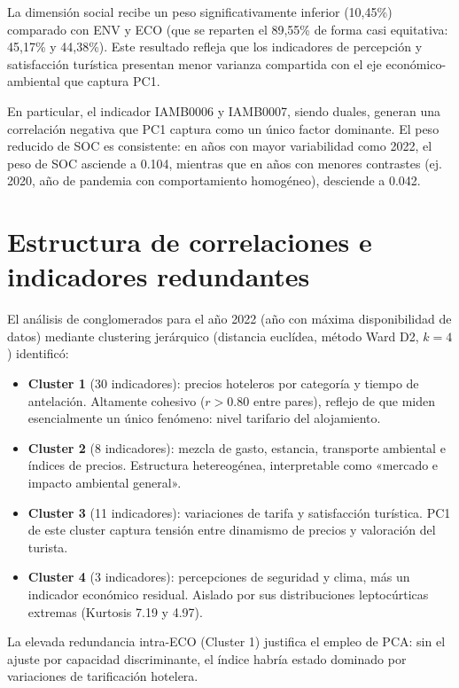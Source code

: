 La dimensión social recibe un peso significativamente inferior (10,45\%) comparado con ENV y ECO (que se reparten el 89,55\% de forma casi equitativa: 45,17\% y 44,38\%). Este resultado refleja que los indicadores de percepción y satisfacción turística presentan menor varianza compartida con el eje económico-ambiental que captura PC1. 

En particular, el indicador IAMB0006 y IAMB0007, siendo duales, generan una correlación negativa que PC1 captura como un único factor dominante. El peso reducido de SOC es consistente: en años con mayor variabilidad como 2022, el peso de SOC asciende a 0.104, mientras que en años con menores contrastes (ej. 2020, año de pandemia con comportamiento homogéneo), desciende a 0.042.

\section{Estructura de correlaciones e indicadores redundantes}

El análisis de conglomerados para el año 2022 (año con máxima disponibilidad de datos) mediante clustering jerárquico (distancia euclídea, método Ward D2, $k=4$) identificó:

\begin{itemize}
    \item \textbf{Cluster 1} (30 indicadores): precios hoteleros por categoría y tiempo de antelación. Altamente cohesivo ($r > 0.80$ entre pares), reflejo de que miden esencialmente un único fenómeno: nivel tarifario del alojamiento.
    \item \textbf{Cluster 2} (8 indicadores): mezcla de gasto, estancia, transporte ambiental e índices de precios. Estructura hetereogénea, interpretable como «mercado e impacto ambiental general».
    \item \textbf{Cluster 3} (11 indicadores): variaciones de tarifa y satisfacción turística. PC1 de este cluster captura tensión entre dinamismo de precios y valoración del turista.
    \item \textbf{Cluster 4} (3 indicadores): percepciones de seguridad y clima, más un indicador económico residual. Aislado por sus distribuciones leptocúrticas extremas (Kurtosis 7.19 y 4.97).
\end{itemize}

La elevada redundancia intra-ECO (Cluster 1) justifica el empleo de PCA: sin el ajuste por capacidad discriminante, el índice habría estado dominado por variaciones de tarificación hotelera.

